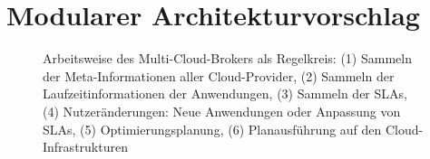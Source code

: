 \section{Modularer Architekturvorschlag}
\label{sec:architektur}

%
%
%


\begin{figure}
	\centering	
	\def\svgwidth{0.95\textwidth}
	{\tiny \textsf{
	}}
	\caption{Arbeitsweise des Multi-Cloud-Brokers als Regelkreis: (1) Sammeln der Meta-Informationen aller Cloud-Provider, (2) Sammeln der Laufzeitinformationen der Anwendungen, (3) Sammeln der SLAs, (4) Nutzeränderungen: Neue Anwendungen oder Anpassung von SLAs, (5) Optimierungsplanung, (6) Planausführung auf den Cloud-Infrastrukturen}
	\label{fig:cycle}
\end{figure}


